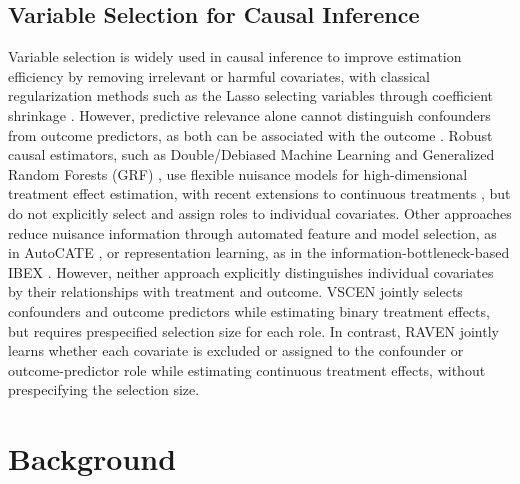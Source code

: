 \documentclass[twoside]{article}
\theoremstyle{plain}
\theoremstyle{definition}
\theoremstyle{remark}
\newtheorem{proof sketch}[theorem]{Proof Sketch}
\begin{document}
{\subsection{Variable Selection for Causal Inference}
\vspace{-0.5em}
Variable selection is widely used in causal inference to improve estimation efficiency by removing irrelevant or harmful covariates, with classical regularization methods such as the Lasso selecting variables through coefficient shrinkage \citep{tibshirani1996regression}. 
However, predictive relevance alone cannot distinguish confounders from outcome predictors, as both can be associated with the outcome \citep{greenewald2021high}.
Robust causal estimators, such as Double/Debiased Machine Learning \citep{chernozhukov2018double} and Generalized Random Forests (GRF) \citep{athey2019generalized}, use flexible nuisance models for high-dimensional treatment effect estimation, with recent extensions to continuous treatments \citep{zenati2025double}, but do not explicitly select and assign roles to individual covariates.
Other approaches reduce nuisance information through automated feature and model selection, as in AutoCATE \citep{vanderschueren2025autocate}, or representation learning, as in the information-bottleneck-based IBEX \citep{van2026continuous}. 
However, neither approach explicitly distinguishes individual covariates by their relationships with treatment and outcome.
VSCEN \citep{ma2025simultaneous} jointly selects confounders and outcome predictors while estimating binary treatment effects, but requires prespecified selection size for each role. In contrast, 
RAVEN jointly learns whether each covariate is excluded or assigned to the confounder or outcome-predictor role while estimating continuous treatment effects, without prespecifying the selection size. 


\vspace{-0.5em}
\section{Background}
\vspace{-0.5em}
}
\end{document}
